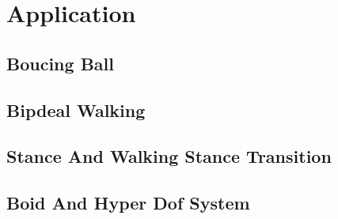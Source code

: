 \section{Application}
\subsection{Boucing Ball}
\subsection{Bipdeal Walking}
\subsection{Stance And Walking Stance Transition}
\subsection{Boid And Hyper Dof System}

